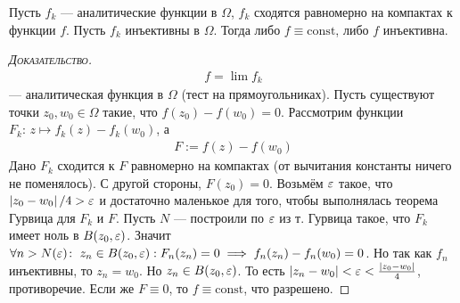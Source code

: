 \documentclass[../complex-analysis.tex]{subfiles}
\begin{document}
 \begin{thm}
  Пусть $ f_k $ --- аналитические функции в $ \Omega $, $ f_k $ сходятся равномерно на компактах к функции $ f $. Пусть $ f_k $ инъективны в $ \Omega $. Тогда либо $ f \equiv \mathrm{const} $, либо $ f $ инъективна.
 \end{thm}
 \begin{proof}[\normalfont\textsc{Доказательство}]
  \begin{align*}
   f = \lim f_k
  \end{align*} --- аналитическая функция в $ \Omega $ (тест на прямоугольниках). Пусть существуют точки $ z_0,w_0 \in \Omega $ такие, что $ f(z_0) - f(w_0) = 0 $. Рассмотрим функции $ F_k \colon\, z \mapsto f_k(z) - f_k(w_0) $, а
  \begin{align*}
   F := f(z) - f(w_0)
  \end{align*} Дано $F_k$ сходится к $ F $ равномерно на компактах (от вычитания константы ничего не поменялось). С другой стороны, $ F(z_0) = 0 $. Возьмём $ \varepsilon $ такое, что $ \left| z_0 - w_0 \right| / 4 > \varepsilon $ и достаточно маленькое для того, чтобы выполнялась теорема Гурвица для $ F_k $ и $ F $. Пусть $ N $ --- построили по $ \varepsilon $ из т. Гурвица такое, что $ F_k $ имеет ноль в $ B(z_0, \varepsilon) $. Значит $ \forall n > N(\varepsilon) \colon\; z_n \in B(z_0,\varepsilon): F_n(z_n) = 0 \implies f_n(z_n) - f_n(w_0) = 0 $. Но так как $ f_n $ инъективны, то $ z_n = w_0 $. Но $ z_n \in B(z_0, \varepsilon) $. То есть $ \left|z_n - w_0 \right| < \varepsilon < \frac{\left| z_0-w_0 \right|}{4} $, противоречие. Если же $ F \equiv 0 $, то $ f \equiv \mathrm{const} $, что разрешено.
 \end{proof}
 
\end{document}
